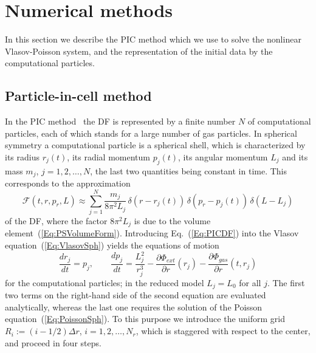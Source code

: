 \section{Numerical methods}
\label{Sec:Numerics}

In this section we describe the PIC method which we use to solve the nonlinear Vlasov-Poisson system, and the representation of the initial data by the computational particles.


\subsection{Particle-in-cell method}
\label{SubSec:PIC}

In the PIC method~\cite{BirdsallLangdon-Book,HockneyEastwood-Book} the DF is represented by a finite number $N$ of computational particles, each of which stands for a large number of gas particles. In spherical symmetry a computational particle is a spherical shell, which is characterized by its radius $r_j(t)$, its radial momentum $p_j(t)$, its angular momentum $L_j$ and its mass $m_j$, $j = 1,2,\ldots,N$, the last two quantities being constant in time. This corresponds to the approximation
\begin{equation}
\mathcal{F}(t,r,p_r,L)\approx \sum\limits_{j=1}^N \frac{m_j}{8\pi^2 L_j}\,\delta(r - r_j(t))\,\delta(p_r - p_j(t))\,\delta(L - L_j)
\label{Eq:PICDF}
\end{equation}
of the DF, where the factor $8\pi^2 L_j$ is due to the volume element~(\ref{Eq:PSVolumeForm}). Introducing Eq.~(\ref{Eq:PICDF}) into the Vlasov equation~(\ref{Eq:VlasovSph}) yields the equations of motion
\begin{equation}
\frac{dr_j}{dt} = p_j,\qquad
\frac{dp_j}{dt} = \frac{L_j^2}{r_j^3} - \frac{\partial\Phi_{ext}}{\partial r}(r_j) - \frac{\partial\Phi_{gas}}{\partial r}(t,r_j)
\label{Eq:EOM}
\end{equation}
for the computational particles; in the reduced model $L_j = L_0$ for all $j$. The first two terms on the right-hand side of the second equation are evaluated analytically, whereas the last one requires the solution of the Poisson equation~(\ref{Eq:PoissonSph}). To this purpose we introduce the uniform grid $R_i := (i - 1/2)\Delta r$, $i = 1,2,\ldots,N_r$, which is staggered with respect to the center, and proceed in four steps.
